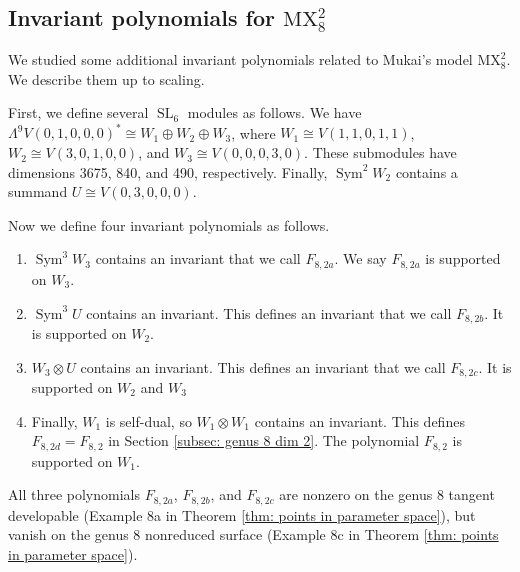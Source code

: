 \documentclass{amsart}[12pt]
\theoremstyle{definition}
\newtheorem{remark}[theorem]{Remark}
\numberwithin{equation}{section}
\newcommand{\Sym}{\operatorname{Sym}}
\newcommand{\SL}{\operatorname{SL}}
\newcommand{\Gr}{\operatorname{Gr}}
\newcommand{\mywedge}{\mathsf{\Lambda}}
\newcommand{\mukai}{\mathrm{MX}}
\begin{document}


\subsection{Invariant polynomials for $\mukai^{2}_8$}
We studied some additional invariant polynomials related to Mukai's
model $\mukai^{2}_8$. We describe them up to scaling. 

First, we define several $\SL_6$ modules as follows. We have $\mywedge^9 V(0,1,0,0,0)^{*} \cong W_1 \oplus W_2 \oplus W_3$, where
$W_1 \cong V(1,1,0,1,1)$, $W_2 \cong V(3,0,1,0,0)$, and $W_3 \cong
V(0,0,0,3,0)$. These submodules have dimensions
3675, 840, and 490, respectively. Finally, $\Sym^2 W_2$ contains a
summand $U \cong V(0,3,0,0,0)$.

Now we define four invariant polynomials as follows.

\begin{enumerate}
\item[(a)] $\Sym^3W_3$ contains an invariant that we call $F_{8,2a}$. We
  say $F_{8,2a}$ is supported on $W_3$.
\item[(b)] $\Sym^3  U$ contains an invariant. This defines
an invariant that we call $F_{8,2b}$. It is supported on $W_2$.  
\item[(c)] $W_3 \otimes U$ contains an invariant. This defines
an invariant that we call $F_{8,2c}$. It is supported on $W_2$ and $W_3$
\item[(d)] Finally, $W_1$ is self-dual, so $W_1 \otimes
W_1$ contains an invariant. This defines $F_{8,2d} = F_{8,2}$ in Section
\ref{subsec: genus 8 dim 2}. The polynomial $F_{8,2}$ is
supported on $W_1$.
\end{enumerate}



All three polynomials $F_{8,2a}$, $F_{8,2b}$, and $F_{8,2c}$ are
nonzero on the genus 8 tangent developable (Example 8a in Theorem \ref{thm: points in parameter space}), but vanish on the genus 8
nonreduced surface (Example 8c in Theorem \ref{thm: points in
  parameter space}).
\end{document}
